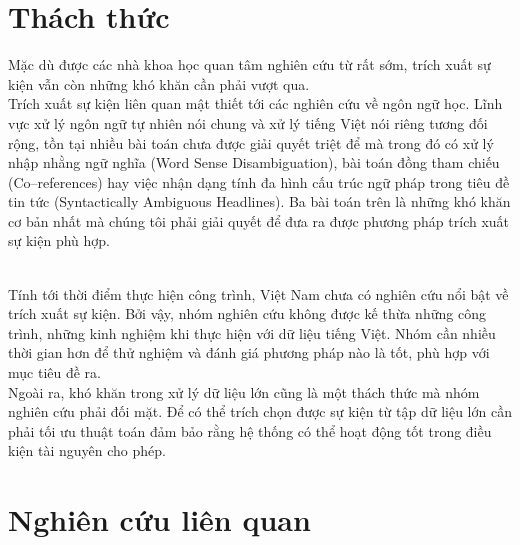  \section{Thách thức}
   \noindent  Mặc dù được các nhà khoa học quan tâm nghiên cứu  từ rất sớm, trích xuất sự kiện vẫn còn những khó khăn cần phải vượt qua. \\
\noindent Trích xuất sự kiện liên quan mật thiết tới các nghiên cứu về ngôn ngữ học. Lĩnh vực xử lý ngôn ngữ tự nhiên nói chung và xử lý tiếng Việt nói riêng tương đối rộng, tồn tại nhiều bài toán chưa được giải quyết triệt để mà trong đó có  xử lý nhập nhằng ngữ nghĩa (Word Sense Disambiguation), bài toán đồng tham chiếu (Co--references) hay việc nhận dạng tính đa hình cấu trúc ngữ pháp trong tiêu đề tin tức (Syntactically  Ambiguous Headlines). Ba bài toán trên là những khó khăn cơ bản nhất mà chúng tôi phải giải quyết để đưa ra được phương pháp trích xuất sự kiện phù hợp.

\\
\noindent Tính tới thời điểm thực hiện công trình, Việt Nam chưa có nghiên cứu nổi bật về trích xuất sự kiện. Bởi vậy, nhóm nghiên cứu không được kế thừa những công trình, những kinh nghiệm khi thực hiện với dữ liệu tiếng Việt. Nhóm cần nhiều thời gian hơn để thử nghiệm và đánh giá phương pháp nào là tốt, phù hợp với mục tiêu đề ra.
\\
\noindent Ngoài ra, khó khăn trong xử lý dữ liệu lớn cũng là một thách thức mà nhóm nghiên cứu phải đối mặt. Để có thể trích chọn được sự kiện từ tập dữ liệu lớn cần phải tối ưu thuật toán đảm bảo rằng hệ thống có thể hoạt động tốt trong điều kiện tài nguyên cho phép.


\section{Nghiên cứu liên quan}
